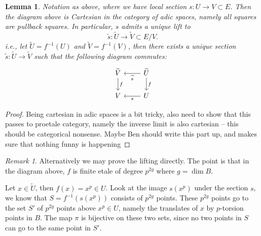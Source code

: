 \documentclass[11pt,oneside]{amsart}
\theoremstyle{theorem}
\newtheorem{lemma}[theorem]{Lemma}
\theoremstyle{definition}
\theoremstyle{remark}
\newtheorem{remark}[theorem]{Remark}
\begin{document}
\begin{lemma} \label{lemma:lifting}
Notation as above, where we have local section $s: U \rightarrow V \subset E$. Then the diagram above is Cartesian in the category of adic spaces, namely all squares are pullback squares. In particular, $s$ admits a unique lift to 
$$\widetilde s : \widetilde U \rightarrow \widetilde V \subset E/V.$$ 
i.e., let $\widetilde U = f^{-1} (U) $ and $\widetilde V = f^{-1} (V)$, then there exists a unique section $\widetilde s: \widetilde U \rightarrow \widetilde V$ such that the following diagram commutes:
\[
\begin{tikzcd}
 \widetilde V     \arrow{d}{f } & \widetilde U  \arrow{d}{f}  \arrow{l}{\widetilde s}\\ 
 V   & U  \arrow{l}{s}
\end{tikzcd}
\]
\end{lemma} 

\begin{proof}
{\color{red} Being cartesian in adic spaces is a bit tricky, also need to show that this passes to proetale category, namely the inverse limit is also cartesian -- this should be categorical nonsense. Maybe Ben should write this part up, and makes sure that nothing funny is happening}
\end{proof} 


\begin{remark} Alternatively we may prove the lifting directly. The point is that in the diagram above, $f$ is finite etale of degree $p^{2g}$ where $g = \dim B$. 
 
Let $x \in \widetilde U$, then $f(x) = x^p \in U$. Look at the image $s(x^p)$ under the section $s$, we know that $S= f^{-1} (s(x^p))$ consists of $p^{2g}$ points. These $p^{2g} $ points go to the set $S'$ of $p^{2g}$ points above $x^p \in U$, namely the translates of $x$ by $p$-torsion points in $B$. The map $\pi$ is bijective on these two sets, since no two points in $S$ can go to the same point in $S'$.
\end{remark}
\end{document}
